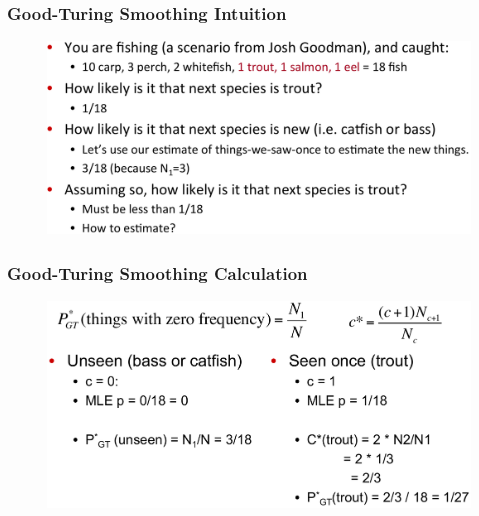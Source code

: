 \documentclass{beamer}
\begin{document}
\begin{frame}\frametitle{Good-Turing Smoothing Intuition}
\begin{figure}
\includegraphics[width=1\linewidth]{figure/good_turing_smoothing.pdf}
\label{fig:good_turing_smoothing}
\end{figure}
\end{frame}


\begin{frame}\frametitle{Good-Turing Smoothing Calculation}
\begin{figure}
\includegraphics[width=0.9\linewidth]{figure/good_turing_calculation.pdf}
\label{fig:good_turing_calculation}
\end{figure}
\end{frame}
\end{document}
